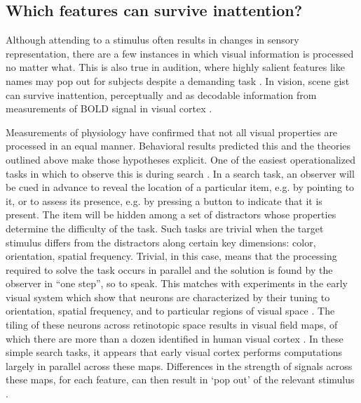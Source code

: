 \subsection{Which features can survive inattention?}

Although attending to a stimulus often results in changes in sensory representation, there are a few instances in which visual information is processed no matter what. This is also true in audition, where highly salient features like names may pop out for subjects despite a demanding task \citep{Moray1959-fn}. In vision, scene gist can survive inattention, perceptually \citep{Li2002-ji} and as decodable information from measurements of BOLD signal in visual cortex \citep{Peelen2009-us}.

Measurements of physiology have confirmed that not all visual properties are processed in an equal manner. Behavioral results predicted this \citep{Li2002-ji,Moray1959-fn} and the theories outlined above make those hypotheses explicit. One of the easiest operationalized tasks in which to observe this is during search \citep{Wolfe1994-ew}. In a search task, an observer will be cued in advance to reveal the location of a particular item, e.g. by pointing to it, or to assess its presence, e.g. by pressing a button to indicate that it is present. The item will be hidden among a set of distractors whose properties determine the difficulty of the task. Such tasks are trivial when the target stimulus differs from the distractors along certain key dimensions: color, orientation, spatial frequency. Trivial, in this case, means that the processing required to solve the task occurs in parallel and the solution is found by the observer in “one step”, so to speak. This matches with experiments in the early visual system which show that neurons are characterized by their tuning to orientation, spatial frequency, and to particular regions of visual space \citep{Barlow1957-by,Hubel1962-pn}. The tiling of these neurons across retinotopic space results in visual field maps, of which there are more than a dozen identified in human visual cortex \citep{Wade2002-tt,Wandell2007-pr,Wandell2011-td}. In these simple search tasks, it appears that early visual cortex performs computations largely in parallel across these maps. Differences in the strength of signals across these maps, for each feature, can then result in ‘pop out’ of the relevant stimulus \citep{Nothdurft1993-xt,Treisman1985-dr}. 

